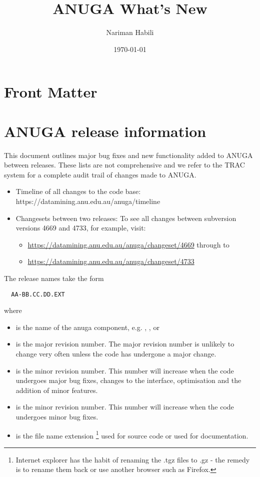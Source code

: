 \documentclass{manual}
\title{ANUGA What's New}
\author{Nariman Habili}
\date{\today}   %
\begin{document}
\maketitle



\ifhtml
\chapter*{Front Matter\label{front}}
\fi




\chapter{ANUGA release information}

This document outlines major bug fixes and new functionality added to ANUGA between releases.
These lists are not comprehensive and we refer to the TRAC system for a complete audit trail of changes made to ANUGA.
\begin{itemize} 
    \item Timeline of all changes to the code base: https://datamining.anu.edu.au/anuga/timeline
    \item Changesets between two releases: To see all changes between subversion versions 4669 and 4733, for example, visit:
    \begin{itemize} 
      \item \url{https://datamining.anu.edu.au/anuga/changeset/4669} through to
      \item \url{https://datamining.anu.edu.au/anuga/changeset/4733}
    \end{itemize}   
\end{itemize}     

The release names take the form
\begin{verbatim}
  AA-BB.CC.DD.EXT
\end{verbatim}
where
\begin{itemize}
  \item {} is the name of the anuga component, e.g. 
  , ,  or 
  \item {} is the major revision number. The major revision number is unlikely to change very often unless the code has undergone a major change.
  \item {} is the minor revision number. This number will increase when the code undergoes major bug fixes, changes to the interface, optimisation and the addition of minor features.
  \item {} is the minor revision number. This number will increase when the code undergoes minor bug fixes.
  \item {} is the file name extension \footnote{Internet explorer has the habit of renaming the .tgz files to .gz - the remedy is to rename them back or use another browser such as Firefox.} used for source code or  used for documentation.
\end{itemize}
\end{document}
